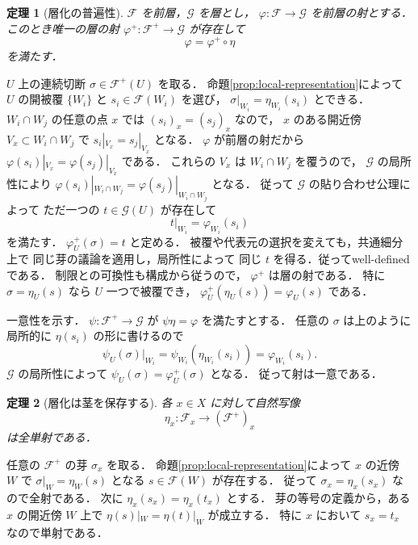 \documentclass[a5paper,10pt,onecolumn]{jsarticle}
\makeatletter
\theoremstyle{mathnotetheorem}
\newtheorem{theorem}{定理}[section]
\renewcommand{\proofname}{証明}
\renewenvironment{proof}[1][\proofname]{%
  \par\pushQED{\qed}\normalfont\topsep4\p@\@plus2\p@\relax
  \trivlist\item[\hskip\labelsep\bfseries #1]\ignorespaces
}{\popQED\endtrivlist\@endpefalse}
\makeatother
\begin{document}
\begin{theorem}[層化の普遍性]\label{thm:sheafification-universal}
$\mathcal F$ を前層，$\mathcal G$ を層とし，
$\varphi:\mathcal F\to\mathcal G$ を前層の射とする．
このとき唯一の層の射
$\varphi^+:\mathcal F^+\to\mathcal G$ が存在して
\[
 \varphi=\varphi^+\circ\eta
\]
を満たす．
\end{theorem}
\begin{proof}
$U$ 上の連続切断 $\sigma\in\mathcal F^+(U)$ を取る．
命題\ref{prop:local-representation}によって
$U$ の開被覆 $\{W_i\}$ と
$s_i\in\mathcal F(W_i)$ を選び，
$\sigma|_{W_i}=\eta_{W_i}(s_i)$ とできる．
$W_i\cap W_j$ の任意の点 $x$ では
$(s_i)_x=(s_j)_x$ なので，
$x$ のある開近傍 $V_x\subset W_i\cap W_j$ で
$s_i|_{V_x}=s_j|_{V_x}$ となる．
$\varphi$ が前層の射だから
$\varphi(s_i)|_{V_x}=\varphi(s_j)|_{V_x}$ である．
これらの $V_x$ は $W_i\cap W_j$ を覆うので，
$\mathcal G$ の局所性により
$\varphi(s_i)|_{W_i\cap W_j}
 =\varphi(s_j)|_{W_i\cap W_j}$ となる．
従って $\mathcal G$ の貼り合わせ公理によって
ただ一つの $t\in\mathcal G(U)$ が存在して
\[
 t|_{W_i}=\varphi_{W_i}(s_i)
\]
を満たす．
$\varphi^+_U(\sigma)=t$ と定める．
被覆や代表元の選択を変えても，共通細分上で
同じ芽の議論を適用し，局所性によって
同じ $t$ を得る．従ってwell-definedである．
制限との可換性も構成から従うので，
$\varphi^+$ は層の射である．
特に $\sigma=\eta_U(s)$ なら
$U$ 一つで被覆でき，
$\varphi^+_U(\eta_U(s))=\varphi_U(s)$ である．

一意性を示す．
$\psi:\mathcal F^+\to\mathcal G$ が
$\psi\eta=\varphi$ を満たすとする．
任意の $\sigma$ は上のように
局所的に $\eta(s_i)$ の形に書けるので
\[
 \psi_U(\sigma)|_{W_i}
 =\psi_{W_i}(\eta_{W_i}(s_i))
 =\varphi_{W_i}(s_i).
\]
$\mathcal G$ の局所性によって
$\psi_U(\sigma)=\varphi^+_U(\sigma)$ となる．
従って射は一意である．
\end{proof}

\begin{theorem}[層化は茎を保存する]\label{thm:stalk-iso}
各 $x\in X$ に対して自然写像
\[
 \eta_x:\mathcal F_x\longrightarrow(\mathcal F^+)_x
\]
は全単射である．
\end{theorem}
\begin{proof}
任意の $\mathcal F^+$ の芽 $\sigma_x$ を取る．
命題\ref{prop:local-representation}によって
$x$ の近傍 $W$ で
$\sigma|_W=\eta_W(s)$ となる
$s\in\mathcal F(W)$ が存在する．
従って $\sigma_x=\eta_x(s_x)$ なので全射である．
次に $\eta_x(s_x)=\eta_x(t_x)$ とする．
芽の等号の定義から，ある $x$ の開近傍 $W$ 上で
$\eta(s)|_W=\eta(t)|_W$ が成立する．
特に $x$ において $s_x=t_x$ なので単射である．
\end{proof}
\end{document}
